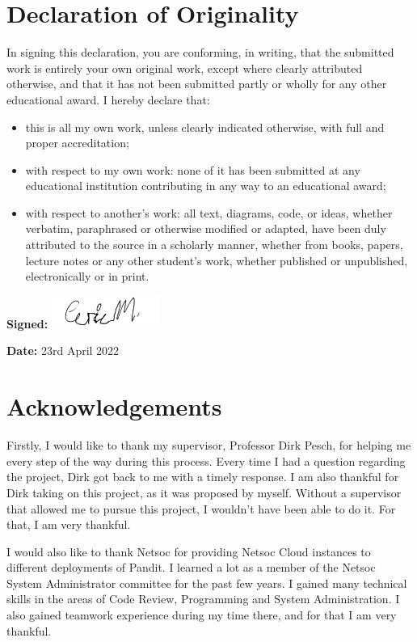 \documentclass[a4paper,12pt]{report}
\begin{document}
\chapter*{Declaration of Originality}
In signing this declaration, you are conforming, in writing, that the submitted work is entirely your own original work, except where clearly attributed otherwise, and that it has not been submitted partly or wholly for any other educational award.
I hereby declare that:
\begin{itemize}
    \item this is all my own work, unless clearly indicated otherwise, with full and proper accreditation;
    \item with respect to my own work: none of it has been submitted at any educational institution contributing in any way to an educational award;
    \item with respect to another’s work: all text, diagrams, code, or ideas,
whether verbatim, paraphrased or otherwise modified or adapted, have
been duly attributed to the source in a scholarly manner, whether
from books, papers, lecture notes or any other student’s work, whether
published or unpublished, electronically or in print.
\end{itemize}

\textbf{Signed:} \includegraphics[width=100pt]{sig.png}

\textbf{Date: } 23rd April 2022

\chapter*{Acknowledgements}

Firstly, I would like to thank my supervisor, Professor Dirk Pesch, for helping me every step of the way during this process. 
Every time I had a question regarding the project, Dirk got back to me with a timely response. 
I am also thankful for Dirk taking on this project, as it was proposed by myself. 
Without a supervisor that allowed me to pursue this project, I wouldn't have been able to do it.
For that, I am very thankful.

I would also like to thank Netsoc for providing Netsoc Cloud instances to different deployments of Pandit.
I learned a lot as a member of the Netsoc System Administrator committee for the past few years.
I gained many technical skills in the areas of Code Review, Programming and System Administration.
I also gained teamwork experience during my time there, and for that I am very thankful.
\end{document}
